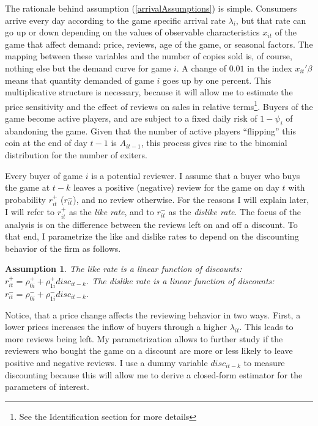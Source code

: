 \documentclass[
  12pt,
  pagebackref]{article}
\newtheorem{assumption}{Assumption}[section]
\begin{document}
The rationale behind assumption (\ref{arrivalAssumptions}) is simple.
Consumers arrive every day according to the game specific arrival rate
\(\lambda_i\), but that rate can go up or down depending on the values
of observable characteristics \(x_{it}\) of the game that affect demand:
price, reviews, age of the game, or seasonal factors. The mapping
between these variables and the number of copies sold is, of course,
nothing else but the demand curve for game \(i\). A change of \(0.01\)
in the index \(x_{it}'\beta\) means that quantity demanded of game \(i\)
goes up by one percent. This multiplicative structure is necessary,
because it will allow me to estimate the price sensitivity and the
effect of reviews on sales in relative
terms\footnote{See the Identification section for more details}. Buyers
of the game become active players, and are subject to a fixed daily risk
of \(1-\psi_i\) of abandoning the game. Given that the number of active
players ``flipping'' this coin at the end of day \(t-1\) is
\(A_{it-1}\), this process gives rise to the binomial distribution for
the number of exiters.

Every buyer of game \(i\) is a potential reviewer. I assume that a buyer
who buys the game at \(t-k\) leaves a positive (negative) review for the
game on day \(t\) with probability \(r_{it}^+\) (\(r_{it}^-\)), and no
review otherwise. For the reasons I will explain later, I will refer to
\(r_{it}^+\) as the \emph{like rate}, and to \(r_{it}^-\) as the
\emph{dislike rate}. The focus of the analysis is on the difference
between the reviews left on and off a discount. To that end, I
parametrize the like and dislike rates to depend on the discounting
behavior of the firm as follows.

\begin{assumption}\label{likeDiscountAss}
The like rate is a linear function of discounts:
$r_{it}^+ = \rho_{0i}^+ + \rho_{1i}^+ disc_{it-k}$.  The dislike rate is a linear function of discounts: $r_{it}^- = \rho_{0i}^- + \rho_{1i}^- disc_{it-k}$.
\end{assumption}

\noindent Notice, that a price change affects the reviewing behavior in
two ways. First, a lower prices increases the inflow of buyers through a
higher \(\lambda_{it}\). This leads to more reviews being left. My
parametrization allows to further study if the reviewers who bought the
game on a discount are more or less likely to leave positive and
negative reviews. I use a dummy variable \(disc_{it-k}\) to measure
discounting because this will allow me to derive a closed-form estimator
for the parameters of interest.
\end{document}
